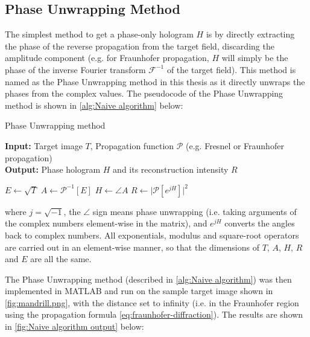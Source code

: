 \subsection{Phase Unwrapping Method}\label{sec:Naive algorithm}
The simplest method to get a phase-only hologram $H$ is by directly extracting the phase of the reverse propagation from the target field, discarding the amplitude component (e.g. for Fraunhofer propagation, $H$ will simply be the phase of the inverse Fourier transform $\mathcal{F} ^{-1}$ of the target field). This method is named as the Phase Unwrapping method in this thesis as it directly unwraps the phases from the complex values. The pseudocode of the Phase Unwrapping method is shown in \cref{alg:Naive algorithm} below:
\begin{algorithm}[H]
  \caption{Phase Unwrapping method}\label{alg:Naive algorithm}
  \textbf{Input:} Target image $T$, Propagation function $\mathcal{P}$ (e.g. Fresnel or Fraunhofer propagation)\\
  \textbf{Output:} Phase hologram $H$ and its reconstruction intensity $R$
  \begin{algorithmic}
    \State $E \gets \sqrt{T}$
    \State $A \gets \mathcal{P}^{-1}[E]$
    \State $H \gets \angle A$
    \State $R \gets \vert \mathcal{P}[e^{jH}] \vert ^2 $
  \end{algorithmic}
\end{algorithm}
where $j = \sqrt{-1} $, the $\angle$ sign means phase unwrapping (i.e. taking arguments of the complex numbers element-wise in the matrix), and $e^{jH}$ converts the angles back to complex numbers. All exponentials, modulus and square-root operators are carried out in an element-wise manner, so that the dimensions of $T$, $A$, $H$, $R$ and $E$ are all the same.

The Phase Unwrapping method (described in \cref{alg:Naive algorithm}) was then implemented in MATLAB and run on the sample target image shown in \cref{fig:mandrill.png}, with the distance set to infinity (i.e. in the Fraunhofer region using the propagation formula \cref{eq:fraunhofer-diffraction}). The results are shown in \cref{fig:Naive algorithm output} below:


